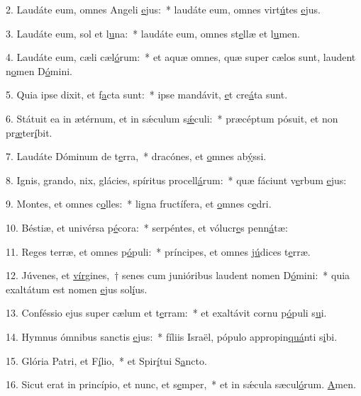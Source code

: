 2. Laudáte eum, omnes Angeli \uline{e}jus:~* laudáte eum, omnes virt\uline{ú}tes \uline{e}jus.\par 
3. Laudáte eum, sol et l\uline{u}na:~* laudáte eum, omnes st\uline{e}llæ et l\uline{u}men.\par 
4. Laudáte eum, cæli cæl\uline{ó}rum:~* et aquæ omnes, quæ super cælos sunt, laudent n\uline{o}men D\uline{ó}mini.\par 
5. Quia ipse dixit, et f\uline{a}cta sunt:~* ipse mandávit, \uline{e}t cre\uline{á}ta sunt.\par 
6. Státuit ea in ætérnum, et in sǽculum s\uline{ǽ}culi:~* præcéptum pósuit, et non pr\uline{æ}ter\uline{í}bit.\par 
7. Laudáte Dóminum de t\uline{e}rra,~* dracónes, et \uline{o}mnes ab\uline{ý}ssi.\par 
8. Ignis, grando, nix, glácies, spíritus procell\uline{á}rum:~* quæ fáciunt v\uline{e}rbum \uline{e}jus:\par 
9. Montes, et omnes c\uline{o}lles:~* ligna fructífera, et \uline{o}mnes c\uline{e}dri.\par 
10. Béstiæ, et univérsa p\uline{é}cora:~* serpéntes, et vólucr\uline{e}s penn\uline{á}tæ:\par 
11. Reges terræ, et omnes p\uline{ó}puli:~* príncipes, et omnes j\uline{ú}dices t\uline{e}rræ.\par 
12. Júvenes, et \uline{vír}gines,~† senes cum junióribus laudent nomen D\uline{ó}mini:~* quia exaltátum est nomen \uline{e}jus sol\uline{í}us.\par 
13. Conféssio ejus super cælum et t\uline{e}rram:~* et exaltávit cornu p\uline{ó}puli s\uline{u}i.\par 
14. Hymnus ómnibus sanctis \uline{e}jus:~* fíliis Israël, pópulo appropin\uline{quá}nti s\uline{i}bi.\par 
15. Glória Patri, et F\uline{í}lio,~* et Spir\uline{í}tui S\uline{a}ncto.\par 
16. Sicut erat in princípio, et nunc, et s\uline{e}mper,~* et in sǽcula sæcul\uline{ó}rum. \uline{A}men.\par 
